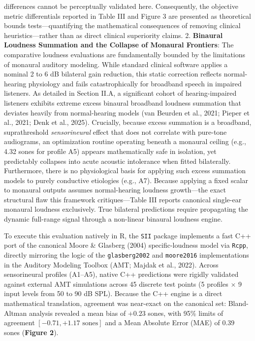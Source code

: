 \documentclass[
  12pt,
]{article}
\begin{document}
differences cannot be perceptually validated here. Consequently, the
objective metric differentials reported in Table III and Figure 3 are
presented as theoretical bounds tests---quantifying the mathematical
consequences of removing clinical heuristics---rather than as direct
clinical superiority claims. 2. \textbf{Binaural Loudness Summation and
the Collapse of Monaural Frontiers}: The comparative loudness
evaluations are fundamentally bounded by the limitations of monaural
auditory modeling. While standard clinical software applies a nominal 2
to 6 dB bilateral gain reduction, this static correction reflects
normal-hearing physiology and fails catastrophically for broadband
speech in impaired listeners. As detailed in Section II.A, a significant
cohort of hearing-impaired listeners exhibits extreme excess binaural
broadband loudness summation that deviates heavily from normal-hearing
models (van Beurden et al., 2021; Pieper et al., 2021; Denk et al.,
2025). Crucially, because excess summation is a broadband,
suprathreshold \emph{sensorineural} effect that does not correlate with
pure-tone audiograms, an optimization routine operating beneath a
monaural ceiling (e.g., 4.32 sones for profile A5) appears
mathematically safe in isolation, yet predictably collapses into acute
acoustic intolerance when fitted bilaterally. Furthermore, there is no
physiological basis for applying such excess summation models to purely
conductive etiologies (e.g., A7). Because applying a fixed scalar to
monaural outputs assumes normal-hearing loudness growth---the exact
structural flaw this framework critiques---Table III reports canonical
single-ear monaural loudness exclusively. True bilateral predictions
require propagating the dynamic full-range signal through a non-linear
binaural loudness engine.

To execute this evaluation natively in R, the \texttt{SII} package
implements a fast C++ port of the canonical Moore \& Glasberg (2004)
specific-loudness model via \texttt{Rcpp}, directly mirroring the logic
of the \texttt{glasberg2002} and \texttt{moore2016} implementations in
the Auditory Modeling Toolbox (AMT; Majdak et al., 2022). Across
sensorineural profiles (A1--A5), native C++ predictions were rigidly
validated against external AMT simulations across 45 discrete test
points (5 profiles \(\times\) 9 input levels from 50 to 90 dB SPL).
Because the C++ engine is a direct mathematical translation, agreement
was near-exact on the canonical set: Bland-Altman analysis revealed a
mean bias of \(+0.23\) sones, with 95\% limits of agreement
\([-0.71, +1.17 \text{ sones}]\) and a Mean Absolute Error (MAE) of
\(0.39\) sones (\textbf{Figure 2}).
\end{document}
